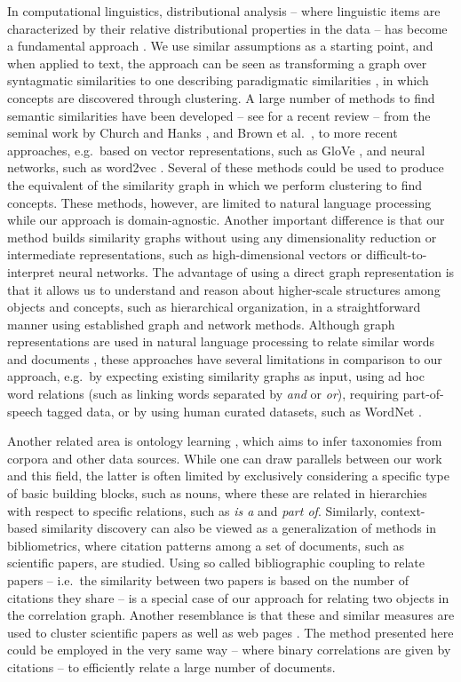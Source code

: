 \documentclass[conference]{IEEEtran}
\begin{document}
In computational linguistics, distributional analysis -- where linguistic items are characterized by
their relative distributional properties in the data -- has become a fundamental approach \cite{Harris-1970}. We use
similar assumptions as a starting point, and when applied to text, the approach can be seen as transforming a graph
over syntagmatic similarities to one describing paradigmatic similarities \cite{Sahlgren-2006}, in which
concepts are discovered through clustering. A large number of methods to find semantic similarities have been
developed -- see \cite{Harispe2015} for a recent review -- from the seminal work by Church and Hanks \cite{Church90}, and Brown 
et al.\ \cite{Brown1992}, to more recent approaches, e.g.\ based on vector representations, such as GloVe 
\cite{Pennington2014}, and neural networks, such as word2vec \cite{Mikolov-2013}. 
Several of these methods could be used to produce the equivalent of the similarity graph in which we perform
clustering to find concepts. These methods, however, are limited to natural language processing while our approach 
is domain-agnostic. Another important difference is that our method builds similarity graphs without 
using any dimensionality reduction or intermediate representations, such as high-dimensional vectors 
or difficult-to-interpret neural networks. The advantage of using a direct graph representation is that it allows us to
understand and reason about higher-scale structures among objects and concepts, such as hierarchical organization, in a straightforward 
manner using established graph and network methods. Although graph representations are used in natural language processing to relate 
similar words and documents \cite{Mihalcea2011}, these approaches have several limitations in comparison to our 
approach, e.g.\ by expecting existing similarity graphs as input, using ad hoc word relations (such as linking words separated 
by \emph{and} or \emph{or}), requiring part-of-speech tagged data, or by using human curated datasets, such as WordNet \cite{miller1995wordnet}.

Another related area is ontology learning \cite{Wong2012ontology}, which aims to infer taxonomies 
from corpora and other data sources. While one can draw parallels between our work and this field, the latter is often limited 
by exclusively considering a specific type of basic building blocks, such as nouns, where these are related in 
 hierarchies with respect to specific relations, such as \emph{is a} and \emph{part of}. Similarly, context-based similarity
  discovery can also be viewed as a generalization of methods in bibliometrics, where citation patterns among a set of 
  documents, such as scientific papers, are studied. Using so called bibliographic coupling to relate papers  \cite{Kessler1963} 
  -- i.e.\ the similarity between two papers is based on the number of  citations they share -- is a special case of our approach 
  for relating two objects in the correlation graph. Another resemblance is that  these and similar measures are used to cluster 
  scientific papers \cite{Small1973} as well as web pages \cite{Larson96}. The method presented here could be employed in 
  the very same way -- where binary correlations are given by citations -- to efficiently relate a large number of documents.
\end{document}
